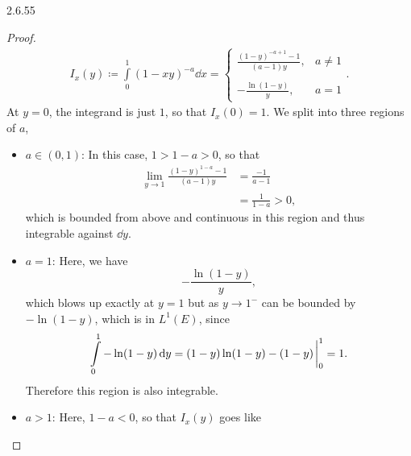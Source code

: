 \documentclass[11pt]{article}
\begin{document}
\begin{problem}{2.6.55}
\begin{enumerate}[label=\alph*.]
\begin{proof}
            \begin{equation}
            \label{eq:3}
            \begin{aligned}
              I_x(y) \coloneq \int\limits_0^1 (1-xy)^{-a}\dd{x} = \begin{cases}
                \frac{(1-y)^{-a+1} - 1}{(a-1)y}, & a \neq 1 \\\\
                -\frac{\ln(1-y)}{y}, & a = 1
              \end{cases}.
            \end{aligned}
          \end{equation}
          At \( y = 0 \), the integrand is just \( 1 \), so that \( I_x(0) = 1 \).
          We split into three regions of \( a \),
          \begin{itemize}
            \item \( a \in (0,1) \): In this case, \( 1 > 1-a > 0 \), so that
                  \begin{equation}
                  \label{eq:4}
                  \begin{aligned}
                    \lim_{y\rightarrow1} \frac{(1-y)^{1-a}-1}{(a-1)y} &= \frac{-1}{a-1} \\
                    &= \frac{1}{1-a} > 0,
                  \end{aligned}
                \end{equation}
                  which is bounded from above and continuous in this region and thus integrable against \( \dd{y} \).
            \item \( a = 1 \): Here, we have
                  \begin{equation}
                  \label{eq:6}
                  -\frac{\ln(1-y)}{y},
                \end{equation}
                  which blows up exactly at \( y=1 \) but as \( y \rightarrow 1^- \) can be bounded by \( -\ln(1-y) \), which is in \( L^1(E) \), since
                  \begin{equation}
                  \label{eq:7}
                  \int\limits_0^1-\ln(1-y)\dd{y} = (1-y)\ln(1-y) - (1-y)\eval_0^1 = 1.
                \end{equation}
                  Therefore this region is also integrable.
            \item \( a > 1 \): Here, \( 1-a < 0 \), so that \( I_x(y) \) goes like
                  \begin{equation}
                  \label{eq:9}

\end{equation}
\end{itemize}
\end{proof}
\end{enumerate}
\end{problem}
\end{document}
